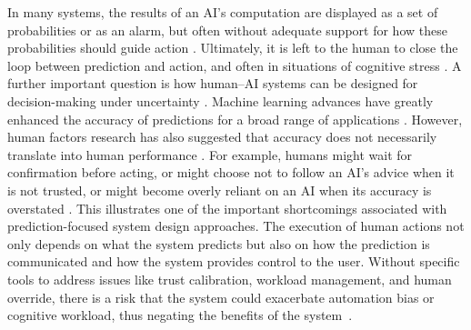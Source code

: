 \documentclass[journal]{IEEEtran}
\theoremstyle{plain}
\theoremstyle{definition}
\begin{document}
In many systems, the results of an AI's computation are displayed as a set of probabilities or as an alarm, but often without adequate support for how these probabilities should guide action \cite{Miller2019XRDS,Bach2024Access}. Ultimately, it is left to the human to close the loop between prediction and action, and often in situations of cognitive stress \cite{Hodgson2013THMS,Zhang2022THMS}. A further important question is how human--AI systems can be designed for decision-making under uncertainty \cite{Lai2023FAccT}.
Machine learning advances have greatly enhanced the accuracy of predictions for a broad range of applications \cite{Mai2024TOS,PerezCerrolaza2024CSUR}. However, human factors research has also suggested that accuracy does not necessarily translate into human performance \cite{Lai2023FAccT,Yang2022THMSReview}. For example, humans might wait for confirmation before acting, or might choose not to follow an AI's advice when it is not trusted, or might become overly reliant on an AI when its accuracy is overstated \cite{Hodgson2013THMS,Raji2019AIES,Raji2022CACM}.
This illustrates one of the important shortcomings associated with prediction-focused system design approaches. The execution of human actions not only depends on what the system predicts but also on how the prediction is communicated and how the system provides control to the user. Without specific tools to address issues like trust calibration, workload management, and human override, there is a risk that the system could exacerbate automation bias or cognitive workload, thus negating the benefits of the system~\cite{Duan2014KDD,Hodgson2013THMS,Zhang2022THMS,Bach2024Access}.
\end{document}
